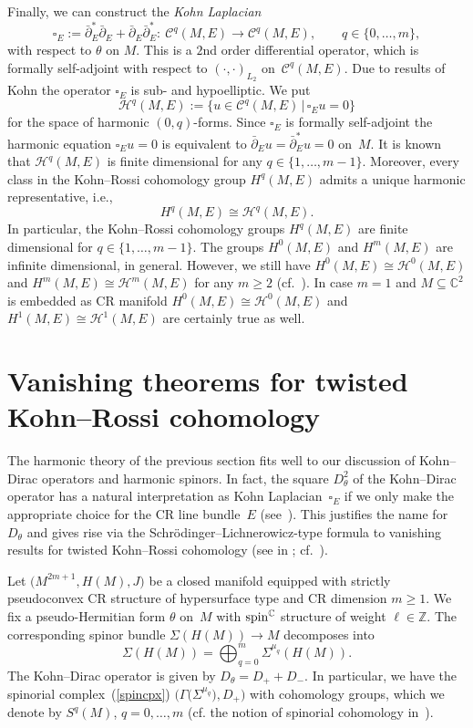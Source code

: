 \documentclass[pdftex]{sigma}
\numberwithin{equation}{section}
\newcommand{\ZZ}{\mathbb{Z}}
\newcommand{\CC}{\mathbb{C}}
\begin{document}
Finally, we can construct the {\em Kohn Laplacian}
\[
\square_E := \bar{\partial}^*_E\bar{\partial}_E+ \bar{\partial}_E\bar{\partial}^*_E\colon \ \mathcal{C}^{q}(M,E) \to \mathcal{C}^{q}(M,E),\qquad q\in\{0,\dots,m\},
\]
with respect to $\theta$ on $M$.
This is a $2$nd order differential operator, which is formally self-adjoint with respect to $(\cdot,\cdot)_{L_2}$ on~$\mathcal{C}^{q}(M,E)$.
Due to results of Kohn the operator $\square_E$ is sub- and hypoelliptic.
We put
\[
\mathcal{H}^q(M,E) := \big\{u\in\mathcal{C}^q(M,E)\,|\, \square_Eu=0\big\}
\]
for the space of harmonic $(0,q)$-forms. Since $\square_E$ is formally self-adjoint the harmonic equation $\square_Eu=0$ is equivalent to
$\bar{\partial}_Eu=\bar{\partial}^*_Eu=0$ on~$M$.
It is known that $\mathcal{H}^q(M,E)$ is finite dimensional for any $q\in\{1,\dots,m-1\}$. Moreover,
every class in the Kohn--Rossi cohomology group $H^q(M,E)$ admits a unique harmonic representative, i.e.,
\[
H^q(M,E) \cong \mathcal{H}^q(M,E).
\]
In particular, the Kohn--Rossi cohomology groups $H^q(M,E)$ are finite dimensional for $q\in\{1,\dots,m-1\}$. The
groups $H^0(M,E)$ and $H^m(M,E)$ are infinite dimensional, in general. However, we still have
$H^0(M,E)\cong \mathcal{H}^0(M,E)$ and $H^m(M,E) \cong \mathcal{H}^m(M,E)$ for any $m\geq 2$ (cf.~\cite{Tan}).
In case $m=1$ and $M\subseteq\CC^2$ is embedded as CR manifold $H^0(M,E) \cong \mathcal{H}^0(M,E)$ and $H^1(M,E) \cong \mathcal{H}^1(M,E)$ are certainly true as well.

\section{Vanishing theorems for twisted Kohn--Rossi cohomology} \label{Sec10}

The harmonic theory of the previous section fits well to our discussion of Kohn--Dirac operators and harmonic spinors.
In fact, the square $D_\theta^2$ of the Kohn--Dirac operator has a natural interpretation as
Kohn Laplacian~$\square_E$ if we only make the appropriate choice for the CR line bundle~$E$ (see~\cite{Pet}). This justifies the name for $D_\theta$
and gives rise via the Schr\"odinger--Lichnerowicz-type formula to vanishing results for twisted Kohn--Rossi cohomology (see in \cite[Section~II, \S~7]{Tan}; cf.~\cite{Lee}).

Let $\big(M^{2m+1}, H(M), J\big)$ be a closed manifold equipped with strictly pseudoconvex CR structure of hypersurface type and CR dimension $m\geq 1$.
We fix a pseudo-Hermitian form $\theta$ on~$M$ with ${\rm spin}^\CC$ structure of weight $\ell\in\ZZ$.
The corresponding spinor bundle $\Sigma(H(M))\to M$ decomposes into
\[%
\Sigma(H(M)) = \bigoplus_{q=0}^m \Sigma^{\mu_q}(H(M)).
\]
The Kohn--Dirac operator is given by $D_\theta=D_++D_-$. In particular, we have the spinorial complex~(\ref{spincpx}) $\big(\Gamma\big(\Sigma^{\mu_q}\big),D_+\big)$
with cohomology groups, which we denote by $S^q(M)$, $q=0,\dots, m$ (cf. the notion of spinorial cohomology in~\cite{Mic}).
\end{document}
